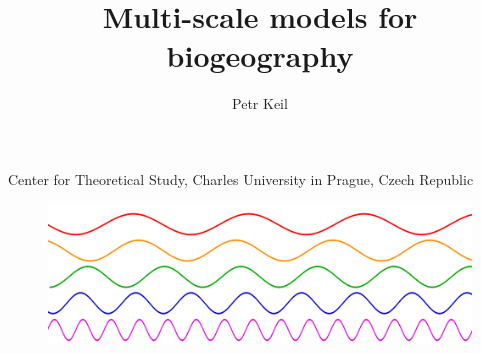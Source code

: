 \documentclass[xcolor=x11names, compress]{beamer}
\renewcommand{\(}{\begin{columns}}
\renewcommand{\)}{\end{columns}}
\newcommand{\<}[1]{\begin{column}{#1}}
\renewcommand{\>}{\end{column}}
\begin{document}

\title[]{\LARGE{Multi-scale models for biogeography}} 
\author{\normalsize{Petr Keil}} %
	\date{}
\institute
{
	\normalsize{Center for Theoretical Study, Charles University in Prague, 
	Czech Republic}
}
\begin{frame}
    \begin{figure}
       \includegraphics[height=0.15\linewidth]{fig/freq.png}
    \end{figure} 
	\titlepage %
\end{frame}

\end{document}

